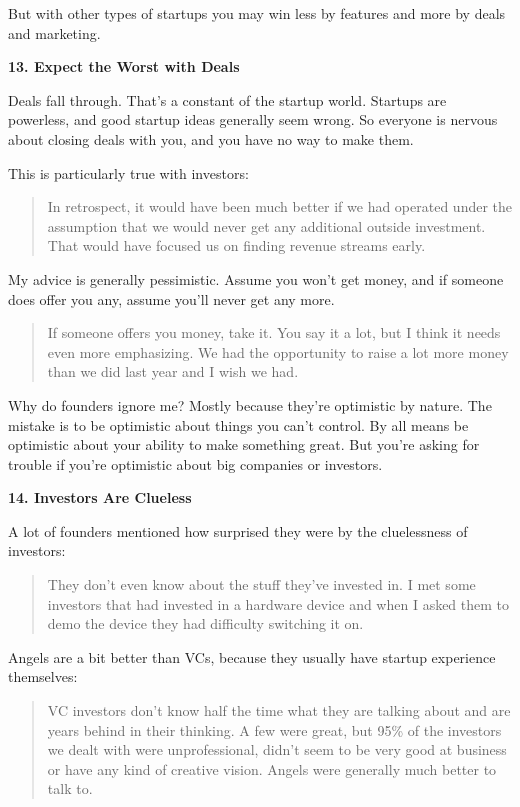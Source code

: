 \documentclass[12pt]{book}
\begin{document}
But with other types of startups you may win less by features and more
by deals and marketing.

\textbf{13. Expect the Worst with Deals}

Deals fall through. That's a constant of the startup world. Startups are
powerless, and good startup ideas generally seem wrong. So everyone is
nervous about closing deals with you, and you have no way to make them.

This is particularly true with investors:

\begin{quote}
In retrospect, it would have been much better if we had operated under
the assumption that we would never get any additional outside
investment. That would have focused us on finding revenue streams early.
\end{quote}

My advice is generally pessimistic. Assume you won't get money, and if
someone does offer you any, assume you'll never get any more.

\begin{quote}
If someone offers you money, take it. You say it a lot, but I think it
needs even more emphasizing. We had the opportunity to raise a lot more
money than we did last year and I wish we had.
\end{quote}

Why do founders ignore me? Mostly because they're optimistic by nature.
The mistake is to be optimistic about things you can't control. By all
means be optimistic about your ability to make something great. But
you're asking for trouble if you're optimistic about big companies or
investors.

\textbf{14. Investors Are Clueless}

A lot of founders mentioned how surprised they were by the cluelessness
of investors:

\begin{quote}
They don't even know about the stuff they've invested in. I met some
investors that had invested in a hardware device and when I asked them
to demo the device they had difficulty switching it on.
\end{quote}

Angels are a bit better than VCs, because they usually have startup
experience themselves:

\begin{quote}
VC investors don't know half the time what they are talking about and
are years behind in their thinking. A few were great, but 95\% of the
investors we dealt with were unprofessional, didn't seem to be very good
at business or have any kind of creative vision. Angels were generally
much better to talk to.
\end{quote}
\end{document}
